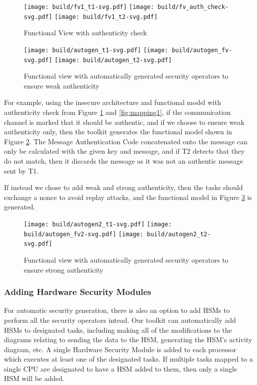 \documentclass[12pt]{article}
\begin{document}
\begin{figure}[htbp]
\centering
\texttt{[image: build/fv1\_t1-svg.pdf]}
\texttt{[image: build/fv\_auth\_check-svg.pdf]}
\texttt{[image: build/fv1\_t2-svg.pdf]}
\caption{Functional View with authenticity check} \label{fig:fv1AuthCheck}
\end{figure}

\begin{figure}[htbp]
\centering
\texttt{[image: build/autogen\_t1-svg.pdf]}
\texttt{[image: build/autogen\_fv-svg.pdf]}
\texttt{[image: build/autogen\_t2-svg.pdf]}
\caption{Functional view with automatically generated security operators to ensure weak authenticity} \label{fig:secfv1}
\end{figure}
  
  For example, using the insecure architecture and functional model with authenticity check from Figure \ref{fig:fv1AuthCheck} and \ref{fig:mapping1}, if the communication channel is marked that it should be authentic, and if we choose to ensure weak authenticity only, then the toolkit generates the functional model shown in Figure \ref{fig:secfv1}. The Message Authentication Code concatenated onto the message can only be calculated with the given key and message, and if T2 detects that they do not match, then it discards the message as it was not an authentic message sent by T1.
  
  If instead we chose to add weak and strong authenticity, then the tasks should exchange a nonce to avoid replay attacks, and the functional model in Figure \ref{fig:secfv2} is generated. 


\begin{figure}[htbp]
\centering
\texttt{[image: build/autogen2\_t1-svg.pdf]}
\texttt{[image: build/autogen\_fv2-svg.pdf]}
\texttt{[image: build/autogen2\_t2-svg.pdf]}
\caption{Functional view with automatically generated security operators to ensure strong authenticity} \label{fig:secfv2}
\end{figure}

\subsubsection{Adding Hardware Security Modules} 

For automatic security generation, there is also an option to add HSMs to perform all the security operators intead. 
Our toolkit can automatically add
HSMs to designated tasks, including making all of the modifications to the
diagrams relating to sending the data to the HSM, generating the HSM's activity
diagram, etc. A single Hardware Security Module is added to each processor which executes at least one of the designated tasks. If multiple tasks mapped to a single CPU are designated to have a HSM added to them, then only a single HSM will be added.
\end{document}
